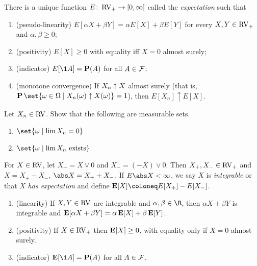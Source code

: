 \begin{theorem*}
\label{thm:expectation}
    There is a unique function $E\colon \operatorname{RV}_+ \to [0, \infty]$ called
    the \emph{expectation} such that
    \begin{enumerate}[label=\small(E\arabic*)]
        \item (pseudo-linearity)
            $E[\alpha X + \beta Y] = \alpha E[X] + \beta E[Y]$
            for every $X, Y \in \operatorname{RV}_+$ and $\alpha, \beta \ge 0$;
        \item (positivity) $E[X] \ge 0$ with equality iff $X = 0$ almost
            surely; %
        \item (indicator) $E[\1A] = \P(A)$ for all $A \in \mathcal F$;
        \item (monotone convergence) If $X_n \uparrow X$ almost surely
        (that is, $\P\set{\omega \in \Omega \mid X_n(\omega)
        \upto X(\omega)} = 1$), then
            $E[X_n] \uparrow E[X]$.
    \end{enumerate}
\end{theorem*}

\begin{exercise}
    Let $X_n \in \operatorname{RV}$.
    Show that the following are measurable sets.
    \begin{enumerate}
        \item $\set{\omega \mid \lim X_n = 0}$
        \item $\set{\omega \mid \lim X_n \text{ exists}}$
    \end{enumerate}
\end{exercise}

\begin{definition}[Expectation] \label{def:expectation}
    For $X \in \operatorname{RV}$, let $X_+ = X \vee 0$ and $X_- = (-X) \vee 0$.
    Then $X_+, X_- \in \operatorname{RV}_+$ and $X = X_+ - X_-$, $\abs X = X_+ + X_-$.
    If $E \abs X < \infty$, we say $X$ is \emph{integrable} or that
    $X$ \emph{has expectation} and define
    $\E[X] \coloneq E[X_+] - E[X_-]$.
\end{definition}

\begin{proposition}
    \leavevmode
    \begin{enumerate}
        \item (linearity) If $X, Y \in \operatorname{RV}$ are integrable and
            $\alpha, \beta \in \R$, then $\alpha X + \beta Y$ is integrable
            and $\operatorname{\mathbf E}[\alpha X + \beta Y] = \alpha \operatorname{\mathbf E}[X] + \beta \operatorname{\mathbf E}[Y]$.
        \item (positivity) If $X \in \operatorname{RV}_+$ then $\operatorname{\mathbf E}[X] \ge 0$,
            with equality only if $X = 0$ almost surely.
        \item (indicator) $\E[\1A] = \P(A)$ for all $A \in \mathcal F$.
    \end{enumerate}
\end{proposition}

